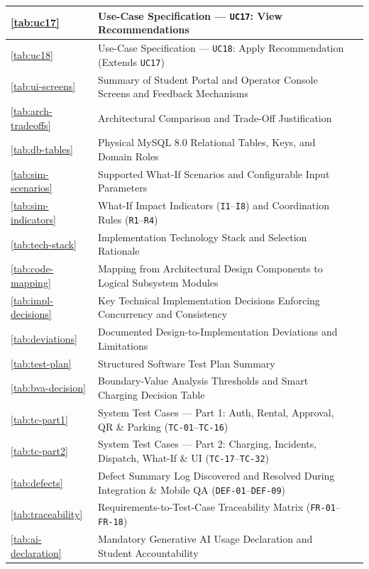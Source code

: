 \documentclass[oneside,final]{hcmut-report}
\begin{document}
{\begin{longtable}[l]{|C{1.5cm}|L{11.85cm}|C{1.32cm}|}
  \hline
  \ref{tab:uc17} & Use-Case Specification --- \texttt{UC17}: View Recommendations & \pageref{tab:uc17} \\
  \hline
  \ref{tab:uc18} & Use-Case Specification --- \texttt{UC18}: Apply Recommendation (Extends \texttt{UC17}) & \pageref{tab:uc18} \\
  \hline
  \ref{tab:ui-screens} & Summary of Student Portal and Operator Console Screens and Feedback Mechanisms & \pageref{tab:ui-screens} \\
  \hline
  \ref{tab:arch-tradeoffs} & Architectural Comparison and Trade-Off Justification & \pageref{tab:arch-tradeoffs} \\
  \hline
  \ref{tab:db-tables} & Physical MySQL 8.0 Relational Tables, Keys, and Domain Roles & \pageref{tab:db-tables} \\
  \hline
  \ref{tab:sim-scenarios} & Supported What-If Scenarios and Configurable Input Parameters & \pageref{tab:sim-scenarios} \\
  \hline
  \ref{tab:sim-indicators} & What-If Impact Indicators (\texttt{I1}--\texttt{I8}) and Coordination Rules (\texttt{R1}--\texttt{R4}) & \pageref{tab:sim-indicators} \\
  \hline
  \ref{tab:tech-stack} & Implementation Technology Stack and Selection Rationale & \pageref{tab:tech-stack} \\
  \hline
  \ref{tab:code-mapping} & Mapping from Architectural Design Components to Logical Subsystem Modules & \pageref{tab:code-mapping} \\
  \hline
  \ref{tab:impl-decisions} & Key Technical Implementation Decisions Enforcing Concurrency and Consistency & \pageref{tab:impl-decisions} \\
  \hline
  \ref{tab:deviations} & Documented Design-to-Implementation Deviations and Limitations & \pageref{tab:deviations} \\
  \hline
  \ref{tab:test-plan} & Structured Software Test Plan Summary & \pageref{tab:test-plan} \\
  \hline
  \ref{tab:bva-decision} & Boundary-Value Analysis Thresholds and Smart Charging Decision Table & \pageref{tab:bva-decision} \\
  \hline
  \ref{tab:tc-part1} & System Test Cases --- Part 1: Auth, Rental, Approval, QR \& Parking (\texttt{TC-01}--\texttt{TC-16}) & \pageref{tab:tc-part1} \\
  \hline
  \ref{tab:tc-part2} & System Test Cases --- Part 2: Charging, Incidents, Dispatch, What-If \& UI (\texttt{TC-17}--\texttt{TC-32}) & \pageref{tab:tc-part2} \\
  \hline
  \ref{tab:defects} & Defect Summary Log Discovered and Resolved During Integration \& Mobile QA (\texttt{DEF-01}--\texttt{DEF-09}) & \pageref{tab:defects} \\
  \hline
  \ref{tab:traceability} & Requirements-to-Test-Case Traceability Matrix (\texttt{FR-01}--\texttt{FR-18}) & \pageref{tab:traceability} \\
  \hline
  \ref{tab:ai-declaration} & Mandatory Generative AI Usage Declaration and Student Accountability & \pageref{tab:ai-declaration} \\
  \hline
\end{longtable}
}
\end{document}
